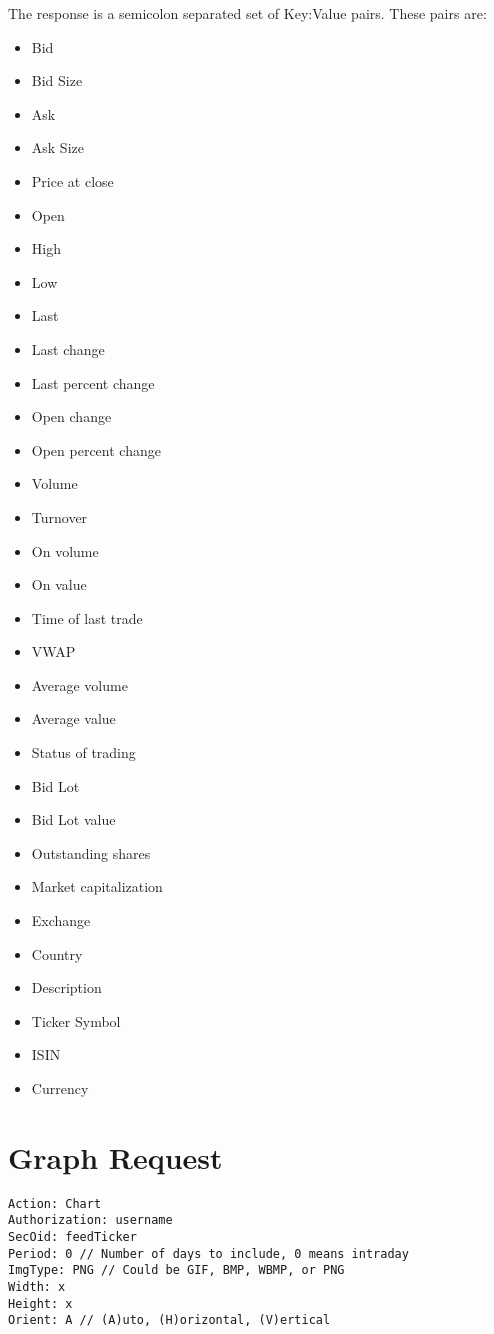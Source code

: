 \documentclass[12pt,twoside,letterpaper]{report}
\begin{document}
The response is a semicolon separated set of Key:Value pairs. These pairs are:
\begin{itemize}
\item Bid
\item Bid Size
\item Ask
\item Ask Size
\item Price at close
\item Open
\item High
\item Low
\item Last
\item Last change
\item Last percent change
\item Open change
\item Open percent change
\item Volume
\item Turnover
\item On volume
\item On value
\item Time of last trade
\item VWAP
\item Average volume
\item Average value
\item Status of trading
\item Bid Lot
\item Bid Lot value
\item Outstanding shares
\item Market capitalization
\item Exchange
\item Country
\item Description
\item Ticker Symbol
\item ISIN
\item Currency
\end{itemize}

\section*{Graph Request}
\begin{verbatim}
Action: Chart
Authorization: username
SecOid: feedTicker
Period: 0 // Number of days to include, 0 means intraday
ImgType: PNG // Could be GIF, BMP, WBMP, or PNG
Width: x
Height: x
Orient: A // (A)uto, (H)orizontal, (V)ertical
\end{verbatim}
\end{document}

